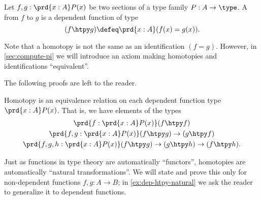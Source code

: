 \begin{defn} \label{defn:homotopy}
  Let $f,g:\prd{x:A} P(x)$ be two sections of a type family $P:A\to\type$.
  A 
  from $f$ to $g$ is a dependent function of type
  \begin{equation*}
    (f\htpy g) \defeq \prd{x:A} (f(x)=g(x)).
  \end{equation*}
\end{defn}

Note that a homotopy is not the same as an identification $(f=g)$.
However, in \cref{sec:compute-pi} we will introduce an axiom making homotopies and identifications ``equivalent''.

The following proofs are left to the reader.

\begin{lem}\label{lem:homotopy-props}
  Homotopy is an equivalence relation on each dependent function type $\prd{x:A} P(x)$.
  That is, we have elements of the types
  \begin{gather*}
    \prd{f:\prd{x:A} P(x)} (f\htpy f)\\
    \prd{f,g:\prd{x:A} P(x)} (f\htpy g) \to (g\htpy f)\\
    \prd{f,g,h:\prd{x:A} P(x)} (f\htpy g) \to (g\htpy h) \to (f\htpy h).
  \end{gather*}
\end{lem}


%
%
Just as functions in type theory are automatically ``functors'', homotopies are automatically
%
``natural transformations''.
We will state and prove this only for non-dependent functions $f,g:A\to B$; in \cref{ex:dep-htpy-natural} we ask the reader to generalize it to dependent functions.

